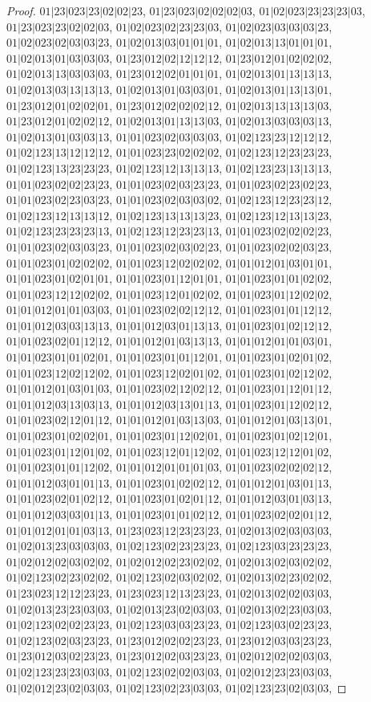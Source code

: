\documentclass[12pt]{article}
\theoremstyle{plain}
\theoremstyle{definition}
\theoremstyle{remark}
\begin{document}
\begin{proof}
$01|23|023|23|02|02|23$, $01|23|023|02|02|02|03$, $01|02|023|23|23|23|03$, $01|23|023|23|02|02|03$, $01|02|023|02|23|23|03$, $01|02|023|03|03|03|23$, $01|02|023|02|03|03|23$, $01|02|013|03|01|01|01$, $01|02|013|13|01|01|01$, $01|02|013|01|03|03|03$, $01|23|012|02|12|12|12$, $01|23|012|01|02|02|02$, $01|02|013|13|03|03|03$, $01|23|012|02|01|01|01$, $01|02|013|01|13|13|13$, $01|02|013|03|13|13|13$, $01|02|013|01|03|03|01$, $01|02|013|01|13|13|01$, $01|23|012|01|02|02|01$, $01|23|012|02|02|02|12$, $01|02|013|13|13|13|03$, $01|23|012|01|02|02|12$, $01|02|013|01|13|13|03$, $01|02|013|03|03|03|13$, $01|02|013|01|03|03|13$, $01|01|023|02|03|03|03$, $01|02|123|23|12|12|12$, $01|02|123|13|12|12|12$, $01|01|023|23|02|02|02$, $01|02|123|12|23|23|23$, $01|02|123|13|23|23|23$, $01|02|123|12|13|13|13$, $01|02|123|23|13|13|13$, $01|01|023|02|02|23|23$, $01|01|023|02|03|23|23$, $01|01|023|02|23|02|23$, $01|01|023|02|23|03|23$, $01|01|023|02|03|03|02$, $01|02|123|12|23|23|12$, $01|02|123|12|13|13|12$, $01|02|123|13|13|13|23$, $01|02|123|12|13|13|23$, $01|02|123|23|23|23|13$, $01|02|123|12|23|23|13$, $01|01|023|02|02|02|23$, $01|01|023|02|03|03|23$, $01|01|023|02|03|02|23$, $01|01|023|02|02|03|23$, $01|01|023|01|02|02|02$, $01|01|023|12|02|02|02$, $01|01|012|01|03|01|01$, $01|01|023|01|02|01|01$, $01|01|023|01|12|01|01$, $01|01|023|01|01|02|02$, $01|01|023|12|12|02|02$, $01|01|023|12|01|02|02$, $01|01|023|01|12|02|02$, $01|01|012|01|01|03|03$, $01|01|023|02|02|12|12$, $01|01|023|01|01|12|12$, $01|01|012|03|03|13|13$, $01|01|012|03|01|13|13$, $01|01|023|01|02|12|12$, $01|01|023|02|01|12|12$, $01|01|012|01|03|13|13$, $01|01|012|01|01|03|01$, $01|01|023|01|01|02|01$, $01|01|023|01|01|12|01$, $01|01|023|01|02|01|02$, $01|01|023|12|02|12|02$, $01|01|023|12|02|01|02$, $01|01|023|01|02|12|02$, $01|01|012|01|03|01|03$, $01|01|023|02|12|02|12$, $01|01|023|01|12|01|12$, $01|01|012|03|13|03|13$, $01|01|012|03|13|01|13$, $01|01|023|01|12|02|12$, $01|01|023|02|12|01|12$, $01|01|012|01|03|13|03$, $01|01|012|01|03|13|01$, $01|01|023|01|02|02|01$, $01|01|023|01|12|02|01$, $01|01|023|01|02|12|01$, $01|01|023|01|12|01|02$, $01|01|023|12|01|12|02$, $01|01|023|12|12|01|02$, $01|01|023|01|01|12|02$, $01|01|012|01|01|01|03$, $01|01|023|02|02|02|12$, $01|01|012|03|01|01|13$, $01|01|023|01|02|02|12$, $01|01|012|01|03|01|13$, $01|01|023|02|01|02|12$, $01|01|023|01|02|01|12$, $01|01|012|03|01|03|13$, $01|01|012|03|03|01|13$, $01|01|023|01|01|02|12$, $01|01|023|02|02|01|12$, $01|01|012|01|01|03|13$, $01|23|023|12|23|23|23$, $01|02|013|02|03|03|03$, $01|02|013|23|03|03|03$, $01|02|123|02|23|23|23$, $01|02|123|03|23|23|23$, $01|02|012|02|03|02|02$, $01|02|012|02|23|02|02$, $01|02|013|02|03|02|02$, $01|02|123|02|23|02|02$, $01|02|123|02|03|02|02$, $01|02|013|02|23|02|02$, $01|23|023|12|12|23|23$, $01|23|023|12|13|23|23$, $01|02|013|02|02|03|03$, $01|02|013|23|23|03|03$, $01|02|013|23|02|03|03$, $01|02|013|02|23|03|03$, $01|02|123|02|02|23|23$, $01|02|123|03|03|23|23$, $01|02|123|03|02|23|23$, $01|02|123|02|03|23|23$, $01|23|012|02|02|23|23$, $01|23|012|03|03|23|23$, $01|23|012|03|02|23|23$, $01|23|012|02|03|23|23$, $01|02|012|02|02|03|03$, $01|02|123|23|23|03|03$, $01|02|123|02|02|03|03$, $01|02|012|23|23|03|03$, $01|02|012|23|02|03|03$, $01|02|123|02|23|03|03$, $01|02|123|23|02|03|03$, 
\end{proof}
\end{document}
